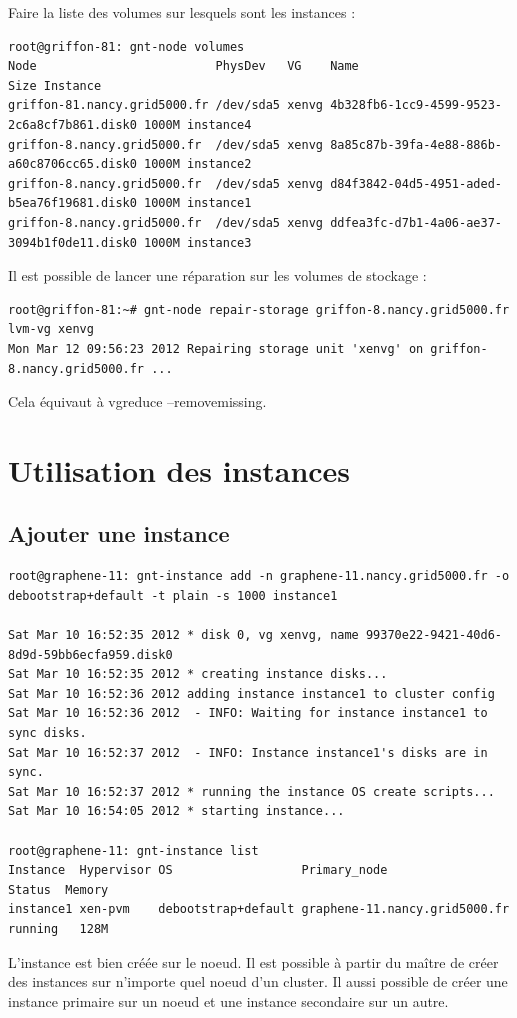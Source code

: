 Faire la liste des volumes sur lesquels sont les instances : 
\begin{lstlisting}
root@griffon-81: gnt-node volumes
Node                         PhysDev   VG    Name                                        Size Instance 
griffon-81.nancy.grid5000.fr /dev/sda5 xenvg 4b328fb6-1cc9-4599-9523-2c6a8cf7b861.disk0 1000M instance4
griffon-8.nancy.grid5000.fr  /dev/sda5 xenvg 8a85c87b-39fa-4e88-886b-a60c8706cc65.disk0 1000M instance2
griffon-8.nancy.grid5000.fr  /dev/sda5 xenvg d84f3842-04d5-4951-aded-b5ea76f19681.disk0 1000M instance1
griffon-8.nancy.grid5000.fr  /dev/sda5 xenvg ddfea3fc-d7b1-4a06-ae37-3094b1f0de11.disk0 1000M instance3
\end{lstlisting}
Il est possible de lancer une réparation sur les volumes de stockage :
\begin{lstlisting}
root@griffon-81:~# gnt-node repair-storage griffon-8.nancy.grid5000.fr lvm-vg xenvg
Mon Mar 12 09:56:23 2012 Repairing storage unit 'xenvg' on griffon-8.nancy.grid5000.fr ...
\end{lstlisting}
Cela équivaut à vgreduce --removemissing.



\section {Utilisation des instances}

\subsection {Ajouter une instance}
\begin{lstlisting}
root@graphene-11: gnt-instance add -n graphene-11.nancy.grid5000.fr -o debootstrap+default -t plain -s 1000 instance1

Sat Mar 10 16:52:35 2012 * disk 0, vg xenvg, name 99370e22-9421-40d6-8d9d-59bb6ecfa959.disk0
Sat Mar 10 16:52:35 2012 * creating instance disks...
Sat Mar 10 16:52:36 2012 adding instance instance1 to cluster config
Sat Mar 10 16:52:36 2012  - INFO: Waiting for instance instance1 to sync disks.
Sat Mar 10 16:52:37 2012  - INFO: Instance instance1's disks are in sync.
Sat Mar 10 16:52:37 2012 * running the instance OS create scripts...
Sat Mar 10 16:54:05 2012 * starting instance...

root@graphene-11: gnt-instance list
Instance  Hypervisor OS                  Primary_node                  Status  Memory
instance1 xen-pvm    debootstrap+default graphene-11.nancy.grid5000.fr running   128M
\end{lstlisting}
L'instance est bien créée sur le noeud. Il est possible à partir du maître de créer des instances sur n'importe quel noeud d'un cluster. Il aussi possible de créer une instance primaire sur un noeud et une instance secondaire sur un autre.

